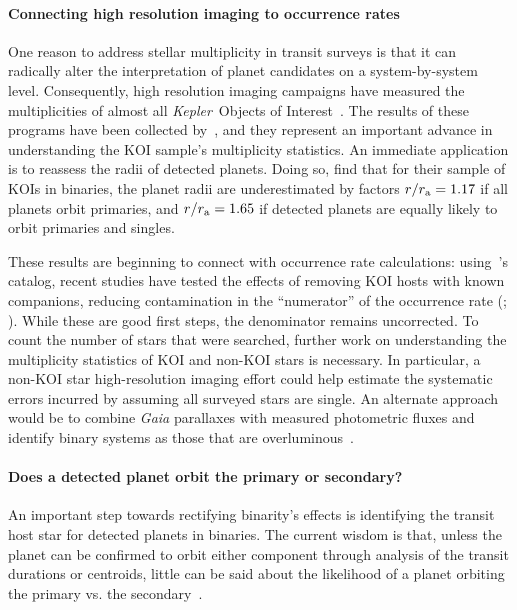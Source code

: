 \documentclass[12pt,modern]{aastex61}
\renewcommand{\a}{_{\rm a}}
\begin{document}
\paragraph{Connecting high resolution imaging to occurrence rates}
One reason to address stellar multiplicity in transit surveys is that
it can radically alter the interpretation of planet candidates on a
system-by-system level.  Consequently, high resolution imaging
campaigns have measured the multiplicities of almost all {\it Kepler}\
Objects of Interest~\citep{
  howell_speckle_2011,adams_adaptive_2012,adams_adaptive_2013,horch_observations_2012,
  horch_most_2014,lillo-box_multiplicity_2012,lillo-box_high-resolution_2014,dressing_adaptive_2014,
  law_robotic_2014,cartier_revision_2015,everett_high-resolution_2015,gilliland_hubble_2015,
  wang_influence_2015,wang_influence_2015-1,baranec_robo-ao_2016,ziegler_robo-ao_2017}.
The results of these programs have been collected
by~\citet{furlan_kepler_2017}, and they represent an important advance
in understanding the KOI sample's multiplicity statistics.  
An immediate application is to reassess the radii of detected planets.
Doing so, \citet{hirsch_assessing_2017} find that for their sample of KOIs
in binaries, the planet radii are underestimated by factors $r/r\a = 1.17$
if all planets orbit primaries, and $r/r\a = 1.65$ if detected
planets are equally likely to orbit primaries and singles.

These results are beginning to connect with
occurrence rate calculations: using~\citet{furlan_kepler_2017}'s
catalog, recent studies have tested the effects of removing KOI hosts with
known companions, reducing contamination in the ``numerator'' of the
occurrence rate (\citealt{fulton_california-_2017};
\citealt{petigura_CKS_2017}).  
While these are good first steps, the
denominator remains uncorrected.  To count the number of stars that
were searched, further work on understanding the multiplicity
statistics of KOI and non-KOI stars is necessary. In particular,
a non-KOI star high-resolution imaging effort could help estimate
the systematic errors incurred by assuming all surveyed stars are
single.
An alternate approach would be to combine {\it Gaia}
parallaxes with measured photometric fluxes and identify binary systems
as those that are 
overluminous~\citep[\textit{e.g.},][]{widmark_inferring_2018}.

\paragraph{Does a detected planet orbit the primary or secondary?}
An important step towards rectifying binarity's effects is
identifying the transit host star for detected planets in binaries.
The current wisdom is that, unless the planet can be confirmed to
orbit either component through analysis of the transit durations or
centroids, little can be said about the likelihood of a
planet orbiting the primary vs. the
secondary~\citep[\textit{e.g.},][but see~\citealt{hirsch_assessing_2017}'s 
approach to weighting radius corrections by planet 
occurrence]{ciardi_understanding_2015,ziegler_robo-ao_2017}.
\end{document}
